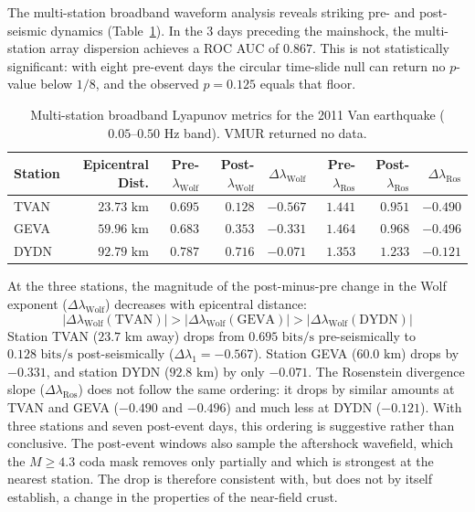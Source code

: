 \documentclass[11pt,a4paper]{article}
\begin{document}
The multi-station broadband waveform analysis reveals striking pre- and post-seismic dynamics (Table~\ref{tab:van_lyapunov}). In the 3 days preceding the mainshock, the multi-station array dispersion achieves a ROC AUC of $0.867$. This is not statistically significant: with eight pre-event days the circular time-slide null can return no $p$-value below $1/8$, and the observed $p = 0.125$ equals that floor.

\begin{table}[htbp]
\centering
\caption{Multi-station broadband Lyapunov metrics for the 2011 Van earthquake ($0.05\text{--}0.50\text{ Hz}$ band). VMUR returned no data.}
\label{tab:van_lyapunov}
\begin{tabular}{lrrrrrrr}
\toprule
Station & Epicentral Dist. & Pre- $\lambda_{\text{Wolf}}$ & Post- $\lambda_{\text{Wolf}}$ & $\Delta \lambda_{\text{Wolf}}$ & Pre- $\lambda_{\text{Ros}}$ & Post- $\lambda_{\text{Ros}}$ & $\Delta \lambda_{\text{Ros}}$ \\
\midrule
TVAN & $23.73\text{ km}$ & $0.695$ & $0.128$ & \textbf{$-0.567$} & $1.441$ & $0.951$ & \textbf{$-0.490$} \\
GEVA & $59.96\text{ km}$ & $0.683$ & $0.353$ & \textbf{$-0.331$} & $1.464$ & $0.968$ & \textbf{$-0.496$} \\
DYDN & $92.79\text{ km}$ & $0.787$ & $0.716$ & \textbf{$-0.071$} & $1.353$ & $1.233$ & \textbf{$-0.121$} \\
\bottomrule
\end{tabular}
\end{table}

At the three stations, the magnitude of the post-minus-pre change in the Wolf exponent ($\Delta \lambda_{\text{Wolf}}$) decreases with epicentral distance:
\begin{equation}
|\Delta \lambda_{\text{Wolf}}(\text{TVAN})| > |\Delta \lambda_{\text{Wolf}}(\text{GEVA})| > |\Delta \lambda_{\text{Wolf}}(\text{DYDN})|
\end{equation}
Station TVAN ($23.7\text{ km}$ away) drops from $0.695\text{ bits/s}$ pre-seismically to $0.128\text{ bits/s}$ post-seismically ($\Delta \lambda_1 = -0.567$). Station GEVA ($60.0\text{ km}$) drops by $-0.331$, and station DYDN ($92.8\text{ km}$) by only $-0.071$. The Rosenstein divergence slope ($\Delta \lambda_{\text{Ros}}$) does not follow the same ordering: it drops by similar amounts at TVAN and GEVA ($-0.490$ and $-0.496$) and much less at DYDN ($-0.121$). With three stations and seven post-event days, this ordering is suggestive rather than conclusive. The post-event windows also sample the aftershock wavefield, which the $M \ge 4.3$ coda mask removes only partially and which is strongest at the nearest station. The drop is therefore consistent with, but does not by itself establish, a change in the properties of the near-field crust.
\end{document}

